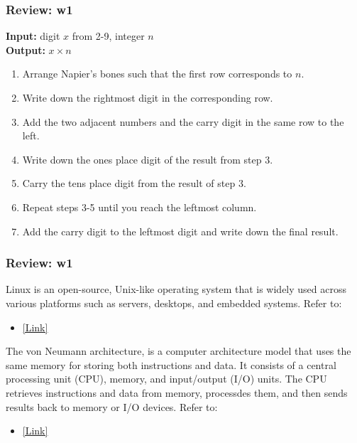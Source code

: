\documentclass[
	11pt, %
]{beamer}
\begin{document}

\begin{frame}
	\frametitle{Review: w1}

	\textbf{Input:} digit $x$ from 2-9, integer $n$ \\
\textbf{Output:} $x \times n$

\begin{enumerate}
    \item Arrange Napier's bones such that the first row corresponds to $n$.
    \item Write down the rightmost digit in the corresponding row.
    \item Add the two adjacent numbers and the carry digit in the same row to the left.
    \item Write down the ones place digit of the result from step 3.
    \item Carry the tens place digit from the result of step 3.
    \item Repeat steps 3-5 until you reach the leftmost column.
    \item Add the carry digit to the leftmost digit and write down the final result.
\end{enumerate}

\end{frame}


\begin{frame}
	\frametitle{Review: w1}

Linux is an open-source, Unix-like operating system that is widely used across various platforms such as servers, desktops, and embedded systems. Refer to:
\begin{itemize}
    \item \href{https://www.linuxfoundation.org/what-is-linux/}{[Link]}
\end{itemize}

\vspace{0.5cm}

The von Neumann architecture, is a computer architecture model that uses the same memory for storing both instructions and data. It consists of a central processing unit (CPU), memory, and input/output (I/O) units. The CPU retrieves instructions and data from memory, processdes them, and then sends results back to memory or I/O devices. Refer to:
\begin{itemize}
    \item \href{https://www.britannica.com/technology/von-Neumann-machine}{[Link]}
\end{itemize}


\end{frame}
\end{document}
